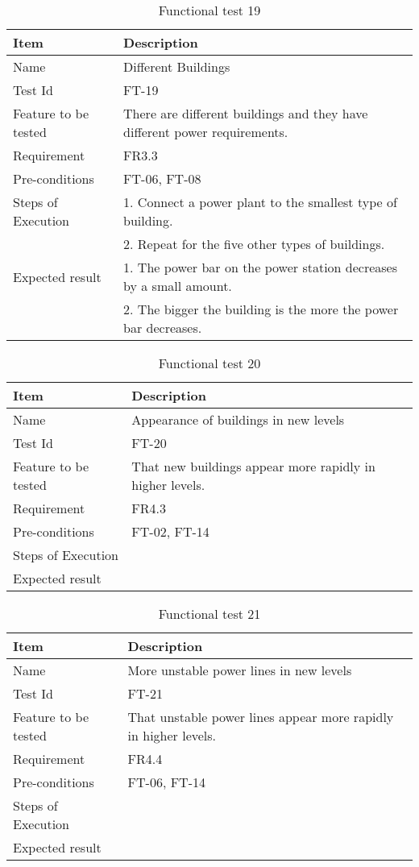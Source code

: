 \begin{table}[H]
\centering
	\begin{tabular}{ l | p{8cm} }
		\hline
		{\bf Item} & {\bf Description} \\ \hline
		Name & Different Buildings \\ 
		Test Id & FT-19 \\ 
		Feature to be tested & There are different buildings and they have different power requirements. \\ 
		Requirement & FR3.3 \\ 
		Pre-conditions & FT-06, FT-08 \\ 
		Steps of Execution & 1. Connect a power plant to the smallest type of building. \\
		& 2. Repeat for the five other types of buildings. \\
		Expected result & 1. The power bar on the power station decreases by a small amount. \\
		& 2. The bigger the building is the more the power bar decreases. \\
	\end{tabular}
	\caption{Functional test 19}
\end{table}

\begin{table}[H]
\centering
	\begin{tabular}{ l | p{8cm} }
		\hline
		{\bf Item} & {\bf Description} \\ \hline
		Name & Appearance of buildings in new levels \\ 
		Test Id & FT-20 \\ 
		Feature to be tested & That new buildings appear more rapidly in higher levels. \\ 
		Requirement & FR4.3 \\ 
		Pre-conditions & FT-02, FT-14\\ 
		Steps of Execution &  \\ 
		Expected result & \\ 
	\end{tabular}
	\caption{Functional test 20}
\end{table}

\begin{table}[H]
\centering
	\begin{tabular}{ l | p{8cm} }
		\hline
		{\bf Item} & {\bf Description} \\ \hline
		Name & More unstable power lines in new levels \\ 
		Test Id & FT-21 \\ 
		Feature to be tested & That unstable power lines appear more rapidly in higher levels. \\ 
		Requirement & FR4.4 \\ 
		Pre-conditions & FT-06, FT-14\\ 
		Steps of Execution &  \\ 
		Expected result & \\ 
	\end{tabular}
	\caption{Functional test 21}
\end{table}

